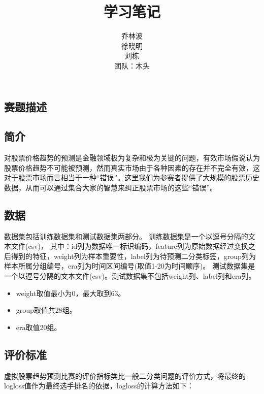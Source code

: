 \documentclass{jmlr}
\begin{document}
\begin{CJK*}{UTF8}{gbsn}

\title{学习笔记}
\author{乔林波 \\
徐晓明 \\
刘栋 \\
\addr 团队：木头\\
}
\date{}
\maketitle

\section{赛题描述}

\subsection{简介}
对股票价格趋势的预测是金融领域极为复杂和极为关键的问题，有效市场假说认为股票价格趋势不可能被预测，然而真实市场由于各种因素的存在并不完全有效，这对于股票市场而言相当于一种“错误”。这里我们为参赛者提供了大规模的股票历史数据，从而可以通过集合大家的智慧来纠正股票市场的这些“错误”。

\subsection{数据}
数据集包括训练数据集和测试数据集两部分。
训练数据集是一个以逗号分隔的文本文件(csv)，
其中：id列为数据唯一标识编码，feature列为原始数据经过变换之后得到的特征，weight列为样本重要性，label列为待预测二分类标签，group列为样本所属分组编号，era列为时间区间编号(取值1-20为时间顺序)。
测试数据集是一个以逗号分隔的文本文件(csv)。测试数据集不包括weight列、label列和era列。

\begin{itemize}
\item weight取值最小为0，最大取到63。
\item group取值共28组。
\item era取值20组。
\end{itemize}


\subsection{评价标准}
虚拟股票趋势预测比赛的评价指标类比一般二分类问题的评价方式，将最终的logloss值作为最终选手排名的依据，logloss的计算方法如下：


\end{CJK*}
\end{document}

